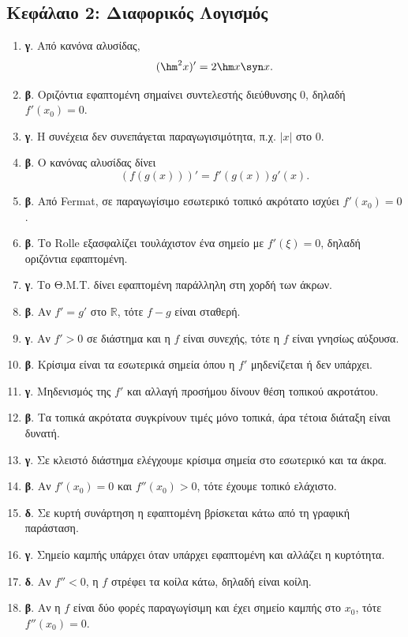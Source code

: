 \subsection*{Κεφάλαιο 2: Διαφορικός Λογισμός}
\begin{enumerate}[label=\textbf{2.\arabic*.}]
\item \textbf{γ}. Από κανόνα αλυσίδας,
\[
(\hm^2 x)'=2\hm x\syn x.
\]
\item \textbf{β}. Οριζόντια εφαπτομένη σημαίνει συντελεστής διεύθυνσης $0$, δηλαδή $f'(x_0)=0$.
\item \textbf{γ}. Η συνέχεια δεν συνεπάγεται παραγωγισιμότητα, π.χ. $|x|$ στο $0$.
\item \textbf{β}. Ο κανόνας αλυσίδας δίνει
\[
(f(g(x)))'=f'(g(x))g'(x).
\]
\item \textbf{β}. Από Fermat, σε παραγωγίσιμο εσωτερικό τοπικό ακρότατο ισχύει $f'(x_0)=0$.
\item \textbf{β}. Το Rolle εξασφαλίζει τουλάχιστον ένα σημείο με $f'(\xi)=0$, δηλαδή οριζόντια εφαπτομένη.
\item \textbf{γ}. Το Θ.Μ.Τ. δίνει εφαπτομένη παράλληλη στη χορδή των άκρων.
\item \textbf{β}. Αν $f'=g'$ στο $\mathbb{R}$, τότε $f-g$ είναι σταθερή.
\item \textbf{γ}. Αν $f'>0$ σε διάστημα και η $f$ είναι συνεχής, τότε η $f$ είναι γνησίως αύξουσα.
\item \textbf{β}. Κρίσιμα είναι τα εσωτερικά σημεία όπου η $f'$ μηδενίζεται ή δεν υπάρχει.
\item \textbf{γ}. Μηδενισμός της $f'$ και αλλαγή προσήμου δίνουν θέση τοπικού ακροτάτου.
\item \textbf{β}. Τα τοπικά ακρότατα συγκρίνουν τιμές μόνο τοπικά, άρα τέτοια διάταξη είναι δυνατή.
\item \textbf{γ}. Σε κλειστό διάστημα ελέγχουμε κρίσιμα σημεία στο εσωτερικό και τα άκρα.
\item \textbf{β}. Αν $f'(x_0)=0$ και $f''(x_0)>0$, τότε έχουμε τοπικό ελάχιστο.
\item \textbf{δ}. Σε κυρτή συνάρτηση η εφαπτομένη βρίσκεται κάτω από τη γραφική παράσταση.
\item \textbf{γ}. Σημείο καμπής υπάρχει όταν υπάρχει εφαπτομένη και αλλάζει η κυρτότητα.
\item \textbf{δ}. Αν $f''<0$, η $f$ στρέφει τα κοίλα κάτω, δηλαδή είναι κοίλη.
\item \textbf{β}. Αν η $f$ είναι δύο φορές παραγωγίσιμη και έχει σημείο καμπής στο $x_0$, τότε $f''(x_0)=0$.

\end{enumerate}
